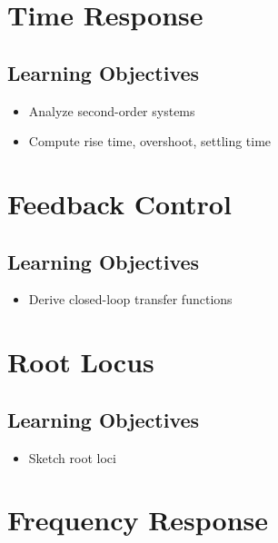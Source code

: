\documentclass[
  letterpaper,
  DIV=11,
  numbers=noendperiod]{scrreprt}
\providecommand{\tightlist}{%
  \setlength{\itemsep}{0pt}\setlength{\parskip}{0pt}}
\begin{document}

\chapter{Time Response}\label{time-response}

\section{Learning Objectives}\label{learning-objectives}

\begin{itemize}
\tightlist
\item
  Analyze second-order systems
\item
  Compute rise time, overshoot, settling time
\end{itemize}


\chapter{Feedback Control}\label{feedback-control}

\section{Learning Objectives}\label{learning-objectives-1}

\begin{itemize}
\tightlist
\item
  Derive closed-loop transfer functions
\end{itemize}


\chapter{Root Locus}\label{root-locus}

\section{Learning Objectives}\label{learning-objectives-2}

\begin{itemize}
\tightlist
\item
  Sketch root loci
\end{itemize}


\chapter{Frequency Response}\label{frequency-response}
\end{document}
